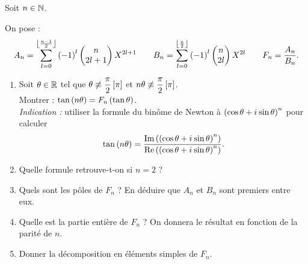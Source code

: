 \begin{corr}
\end{corr}

\begin{exo}
Soit \(n\in\N\).

On pose : \[A_n=\sum_{l=0}^{\floor{\frac{n-1}{2}}}\paren{-1}^l\binom{2l+1}{n}X^{2l+1}\qquad B_n=\sum_{l=0}^{\floor{\frac{n}{2}}}\paren{-1}^l\binom{2l}{n}X^{2l}\qquad F_n=\dfrac{A_n}{B_n}.\]

\begin{enumerate}
\item Soit \(\theta\in\R\) tel que \(\theta\not\equiv\dfrac{\pi}{2}\croch{\pi}\) et \(n\theta\not\equiv\dfrac{\pi}{2}\croch{\pi}\). \\

Montrer : \(\tan\paren{n\theta}=F_n\paren{\tan\theta}\). \\

\textit{Indication :} utiliser la formule du binôme de Newton à \(\paren{\cos\theta+\i\sin\theta}^n\) pour calculer \[\tan\paren{n\theta}=\dfrac{\Im\paren{\paren{\cos\theta+\i\sin\theta}^n}}{\Re\paren{\paren{\cos\theta+\i\sin\theta}^n}}.\]

\item Quelle formule retrouve-t-on si \(n=2\) ? \\

\item Quels sont les pôles de \(F_n\) ? En déduire que \(A_n\) et \(B_n\) sont premiers entre eux. \\

\item Quelle est la partie entière de \(F_n\) ? On donnera le résultat en fonction de la parité de \(n\). \\

\item Donner la décomposition en éléments simples de \(F_n\).
\end{enumerate}
\end{exo}

\begin{corr}
\end{corr}
